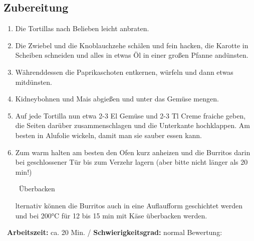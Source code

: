 \begin{minipage}[t]{0.58\textwidth}
\vspace{0pt}
\subsection*{Zubereitung}
\begin{enumerate}[leftmargin=*, itemindent=14pt]

    \item Die Tortillas nach Belieben leicht anbraten.

    \item Die Zwiebel und die Knoblauchzehe schälen und fein hacken, die Karotte in Scheiben schneiden und alles in etwas Öl in einer großen Pfanne andünsten.

    \item Währenddessen die Paprikaschoten entkernen, würfeln und dann etwas mitdünsten.

    \item Kidneybohnen und Mais abgießen und unter das Gemüse mengen.

    \item Auf jede Tortilla nun etwa 2-3 El Gemüse und 2-3 Tl Creme fraiche geben, die Seiten darüber zusammenschlagen und die Unterkante hochklappen. Am besten in Alufolie wickeln, damit man sie sauber essen kann.

    \item Zum warm halten am besten den Ofen kurz anheizen und die Burritos darin bei geschlossener Tür bis zum Verzehr lagern (aber bitte nicht länger als 20 min!)


    \leafNE\, Überbacken

    lternativ können die Burritos auch in eine Auflaufform geschichtet werden und bei 200°C für 12 bis 15 min mit Käse überbacken werden. 

\end{enumerate}
\end{minipage}
\vfill
\decothreeright \, \textbf{Arbeitszeit:} ca. 20 Min. / \textbf{Schwierigkeitsgrad:} normal \decothreeleft \hfill Bewertung: \CIRCLE \CIRCLE \CIRCLE \CIRCLE \LEFTcircle 
